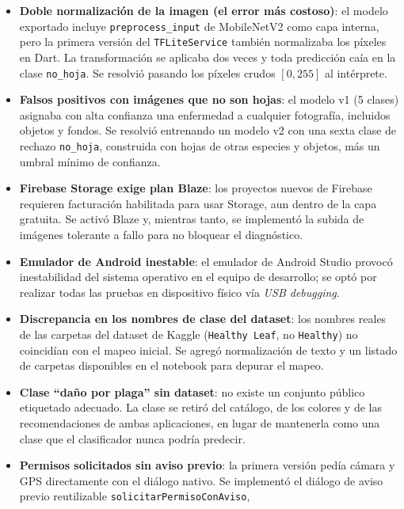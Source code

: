 \documentclass[12pt,a4paper]{article}
\begin{document}
\begin{itemize}
  \item \textbf{Doble normalización de la imagen (el error más costoso)}: el
        modelo exportado incluye \texttt{preprocess\_input} de MobileNetV2 como
        capa interna, pero la primera versión del \texttt{TFLiteService} también
        normalizaba los píxeles en Dart. La transformación se aplicaba dos veces
        y toda predicción caía en la clase \texttt{no\_hoja}. Se resolvió pasando
        los píxeles crudos $[0,255]$ al intérprete.
  \item \textbf{Falsos positivos con imágenes que no son hojas}: el modelo v1
        (5 clases) asignaba con alta confianza una enfermedad a cualquier
        fotografía, incluidos objetos y fondos. Se resolvió entrenando un modelo
        v2 con una sexta clase de rechazo \texttt{no\_hoja}, construida con hojas
        de otras especies y objetos, más un umbral mínimo de confianza.
  \item \textbf{Firebase Storage exige plan Blaze}: los proyectos nuevos de
        Firebase requieren facturación habilitada para usar Storage, aun dentro
        de la capa gratuita. Se activó Blaze y, mientras tanto, se implementó la
        subida de imágenes tolerante a fallo para no bloquear el diagnóstico.
  \item \textbf{Emulador de Android inestable}: el emulador de Android Studio
        provocó inestabilidad del sistema operativo en el equipo de desarrollo;
        se optó por realizar todas las pruebas en dispositivo físico vía
        \textit{USB debugging}.
  \item \textbf{Discrepancia en los nombres de clase del dataset}: los nombres
        reales de las carpetas del dataset de Kaggle (\texttt{Healthy Leaf}, no
        \texttt{Healthy}) no coincidían con el mapeo inicial. Se agregó
        normalización de texto y un listado de carpetas disponibles en el notebook
        para depurar el mapeo.
  \item \textbf{Clase ``daño por plaga'' sin dataset}: no existe un conjunto
        público etiquetado adecuado. La clase se retiró del catálogo, de los
        colores y de las recomendaciones de ambas aplicaciones, en lugar de
        mantenerla como una clase que el clasificador nunca podría predecir.
  \item \textbf{Permisos solicitados sin aviso previo}: la primera versión pedía
        cámara y GPS directamente con el diálogo nativo. Se implementó el
        diálogo de aviso previo reutilizable \texttt{solicitarPermisoConAviso},

\end{itemize}
\end{document}
